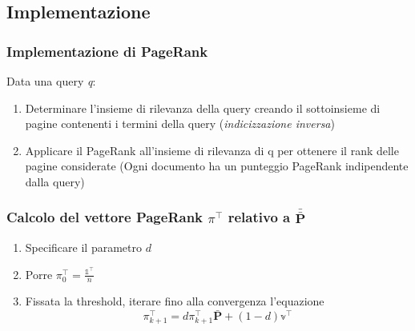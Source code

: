 \documentclass{beamer}
\begin{document}
\subsection{Implementazione}
\begin{frame}
	\frametitle{Implementazione di PageRank}
	Data una query \emph{q}:
	\begin{enumerate}
		\item Determinare l'insieme di rilevanza della query creando il sottoinsieme di pagine contenenti i termini della query (\emph{indicizzazione inversa})
		\item Applicare il PageRank all'insieme di rilevanza di q per ottenere il rank delle pagine considerate (Ogni documento ha un punteggio PageRank indipendente dalla query)
	\end{enumerate}
\end{frame}
\begin{frame}
	\frametitle{Calcolo del vettore PageRank $\pi^\intercal$ relativo a $\bar{\bar{\textbf{P}}}$}
	\begin{enumerate}
		\item Specificare il parametro $d$
		\item Porre $\pi_0^\intercal=\frac{\mathbb{1}^\intercal}{n}$
		\item Fissata la threshold, iterare fino alla convergenza l'equazione $$\pi_{k+1}^\intercal = d \pi_{k+1}^\intercal \bar{\textbf{P}} + (1- d) \mathbb{v}^\intercal  $$
	\end{enumerate}
\end{frame}
\end{document}
